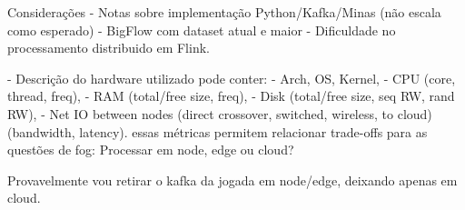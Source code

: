 Considerações
- Notas sobre implementação Python/Kafka/Minas (não escala como esperado)
- BigFlow com dataset atual e maior
- Dificuldade no processamento distribuido em Flink.

- Descrição do hardware utilizado pode conter:
    - Arch, OS, Kernel,
    - CPU (core, thread, freq),
    - RAM (total/free size, freq),
    - Disk (total/free size, seq RW, rand RW),
    - Net IO between nodes (direct crossover, switched, wireless, to cloud) (bandwidth, latency).
essas métricas permitem relacionar trade-offs para as questões de fog: Processar em node, edge ou cloud?

Provavelmente vou retirar o kafka da jogada em node/edge, deixando apenas em cloud.
